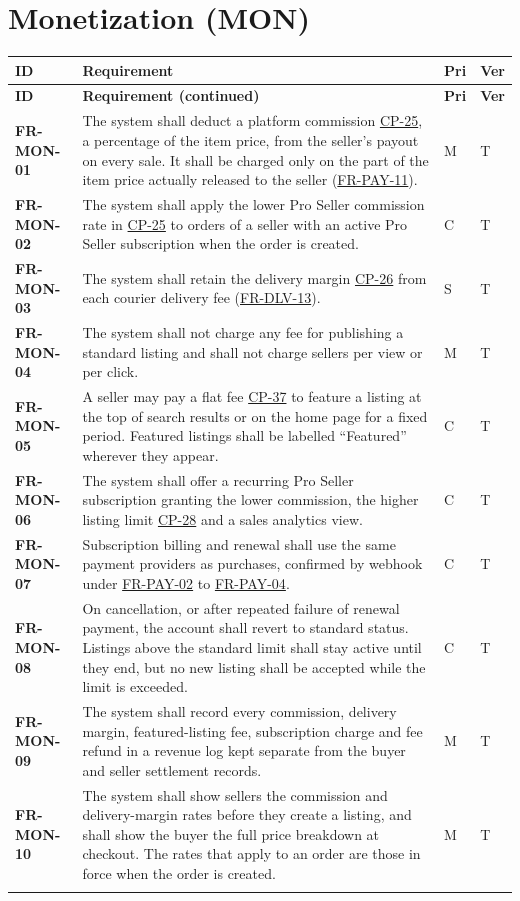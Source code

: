 \documentclass[11pt,a4paper]{report}
\makeatletter
\newenvironment{reqs}{%
  \small
  \begin{longtable}{@{}>{\raggedright\arraybackslash}p{2.35cm}
                       >{\raggedright\arraybackslash}p{10.3cm}
                       >{\centering\arraybackslash}p{0.7cm}
                       >{\centering\arraybackslash}p{0.7cm}@{}}
  \toprule
  \textbf{ID} & \textbf{Requirement} & \textbf{Pri} & \textbf{Ver} \\
  \midrule
  \endfirsthead
  \toprule
  \textbf{ID} & \textbf{Requirement (continued)} & \textbf{Pri} & \textbf{Ver} \\
  \midrule
  \endhead
  \bottomrule
  \endfoot
}{\end{longtable}}
\newcommand{\req}[5]{\leavevmode\textbf{#1}\hypertarget{#1}{} & #5 & #2 & #3 \\ \addlinespace[2pt]}
\newcommand{\rr}[1]{\hyperlink{#1}{#1}}
\newcommand{\cp}[1]{\hyperlink{#1}{#1}}
\makeatother
\begin{document}
\section{Monetization (MON)}
\begin{reqs}
\req{FR-MON-01}{M}{T}{FR-78}{The system shall deduct a platform commission \cp{CP-25}, a percentage of the item price, from the seller's payout on every sale. It shall be charged only on the part of the item price actually released to the seller (\rr{FR-PAY-11}).}
\req{FR-MON-02}{C}{T}{FR-79}{The system shall apply the lower Pro Seller commission rate in \cp{CP-25} to orders of a seller with an active Pro Seller subscription when the order is created.}
\req{FR-MON-03}{S}{T}{FR-80}{The system shall retain the delivery margin \cp{CP-26} from each courier delivery fee (\rr{FR-DLV-13}).}
\req{FR-MON-04}{M}{T}{new}{The system shall not charge any fee for publishing a standard listing and shall not charge sellers per view or per click.}
\req{FR-MON-05}{C}{T}{FR-81, FR-82}{A seller may pay a flat fee \cp{CP-37} to feature a listing at the top of search results or on the home page for a fixed period. Featured listings shall be labelled ``Featured'' wherever they appear.}
\req{FR-MON-06}{C}{T}{FR-83}{The system shall offer a recurring Pro Seller subscription granting the lower commission, the higher listing limit \cp{CP-28} and a sales analytics view.}
\req{FR-MON-07}{C}{T}{FR-84}{Subscription billing and renewal shall use the same payment providers as purchases, confirmed by webhook under \rr{FR-PAY-02} to \rr{FR-PAY-04}.}
\req{FR-MON-08}{C}{T}{FR-85}{On cancellation, or after repeated failure of renewal payment, the account shall revert to standard status. Listings above the standard limit shall stay active until they end, but no new listing shall be accepted while the limit is exceeded.}
\req{FR-MON-09}{M}{T}{FR-86}{The system shall record every commission, delivery margin, featured-listing fee, subscription charge and fee refund in a revenue log kept separate from the buyer and seller settlement records.}
\req{FR-MON-10}{M}{T}{NFR-18}{The system shall show sellers the commission and delivery-margin rates before they create a listing, and shall show the buyer the full price breakdown at checkout. The rates that apply to an order are those in force when the order is created.}
\end{reqs}
\end{document}
